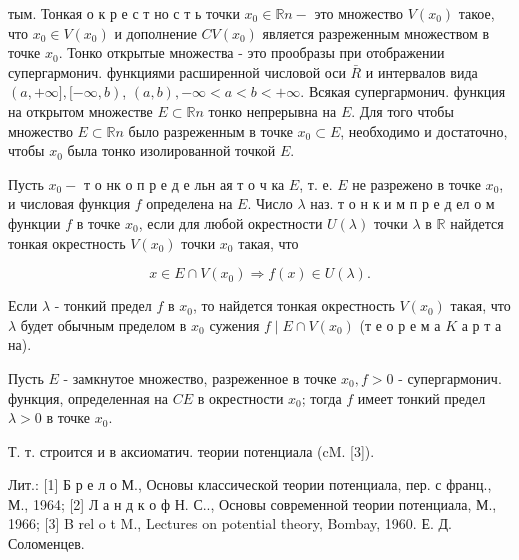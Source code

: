 \documentclass[10pt]{article}
\begin{document}
тым. Тонкая о к р е с т но с т ь точки $x_{0} \in \mathbb{R} n-$ это множество $V\left(x_{0}\right)$ такое, что $x_{0} \in V\left(x_{0}\right)$ и дополнение $C V\left(x_{0}\right)$ является разреженным множеством в точке $x_{0}$. Тонко открытые множества - это прообразы при отображении супергармонич. функциями расширенной числовой оси $\bar{R}$ и интервалов вида $(a,+\infty],[-\infty, b)$, $(a, b),-\infty<a<b<+\infty$. Всякая супергармонич. функция на открытом множестве $E \subset \mathbb{R} n$ тонко непрерывна на $E$. Для того чтобы множество $E \subset \mathbb{R} n$ было разреженным в точке $x_{0} \subset E$, необходимо и достаточно, чтобы $x_{0}$ была тонко изолированной точкой $E$.



Пусть $x_{0}-$ т о нк о п р е д е льн ая т о ч ка $E$, т. е. $E$ не разрежено в точке $x_{0}$, и числовая функция $f$ определена на $E$. Число $\lambda$ наз. т о н к и м п р е д ел о м функции $f$ в точке $x_{0}$, если для любой окрестности $U(\lambda)$ точки $\lambda$ в $\mathbb{R}$ найдется тонкая окрестность $V\left(x_{0}\right)$ точки $x_{0}$ такая, что



\[

x \in E \cap V\left(x_{0}\right) \Rightarrow f(x) \in U(\lambda) .

\]



Если $\lambda$ - тонкий предел $f$ в $x_{0}$, то найдется тонкая окрестность $V\left(x_{0}\right)$ такая, что $\lambda$ будет обычным пределом в $x_{0}$ сужения $f \mid E \cap V\left(x_{0}\right)$ (т е о р е м а $K$ а р т а на).



Пусть $E$ - замкнутое множество, разреженное в точке $x_{0}, f>0$ - супергармонич. функция, определенная на $C E$ в окрестности $x_{0}$; тогда $f$ имеет тонкий предел $\lambda>0$ в точке $x_{0}$.



Т. т. строится и в аксиоматич. теории потенциала (cM. [3]).



Лит.: [1] Б р е л о М., Основы классической теории потенциала, пер. с франц., М., 1964; [2] Л а н д к о ф Н. С.., Основы современной теории потенциала, М., 1966; [3] B rel o t M., Lectures on potential theory, Bombay, 1960. Е. Д. Соломенцев.
\end{document}
